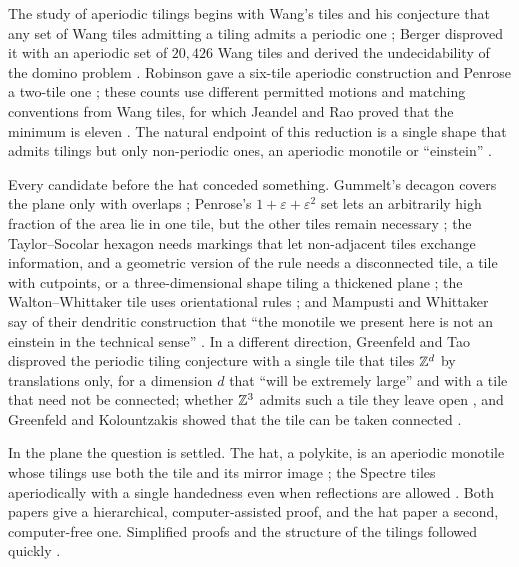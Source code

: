 The study of aperiodic tilings begins with Wang's tiles and his conjecture that any set of
Wang tiles admitting a tiling admits a periodic one \cite{Wan61}; Berger disproved it with an
aperiodic set of $20{,}426$ Wang tiles and derived the undecidability of the domino problem
\cite{Ber66}. Robinson gave a six-tile aperiodic construction \cite{Rob71} and Penrose a two-tile
one \cite{Pen78}; these counts use different permitted motions and matching conventions from Wang
tiles, for which Jeandel and Rao proved that the minimum is eleven \cite{JR21}. The natural endpoint
of this reduction is a single shape that admits tilings but only non-periodic ones, an aperiodic
monotile or ``einstein'' \cite{SMKGS24}.

Every candidate before the hat conceded something. Gummelt's decagon covers the plane only with
overlaps \cite{Gum96}; Penrose's $1+\varepsilon+\varepsilon^2$ set lets an arbitrarily high
fraction of the area lie in one tile, but the other tiles remain necessary \cite{Pen97}; the
Taylor--Socolar hexagon needs markings that let
non-adjacent tiles exchange information, and a geometric version of the rule needs a disconnected
tile, a tile with cutpoints, or a three-dimensional shape tiling a thickened plane
\cite{Tay10,ST11,ST12}; the Walton--Whittaker tile uses orientational rules \cite{WW23}; and
Mampusti and Whittaker say of their dendritic construction that ``the monotile we present here
is not an einstein in the technical sense'' \cite{MW20}. In a different direction, Greenfeld and
Tao disproved the periodic tiling conjecture with a single tile that tiles $\mathbb{Z}^d$ by translations
only, for a dimension $d$ that ``will be extremely large'' and with a tile that need not be
connected; whether $\mathbb{Z}^3$ admits such a tile they leave open \cite{GT24}, and Greenfeld and
Kolountzakis showed that the tile can be taken connected \cite{GK23}.

In the plane the question is settled. The hat, a polykite, is an aperiodic monotile whose tilings
use both the tile and its mirror image \cite{SMKGS24}; the Spectre tiles aperiodically with a
single handedness even when reflections are allowed \cite{SMKGS24b}. Both papers give a
hierarchical, computer-assisted proof, and the hat paper a second, computer-free one. Simplified
proofs and the structure of the tilings followed quickly \cite{AA25,BGS25,BGMM25,Soc23}.

